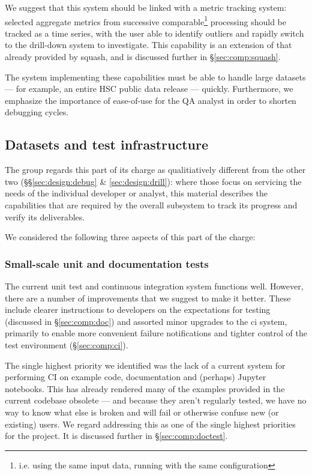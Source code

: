 We suggest that this system should be linked with a metric tracking system:
selected \glspl{aggregate metric} from successive comparable\footnote{i.e.
using the same input data, running with the same configuration} processing
should be tracked as a time series, with the user able to identify outliers
and rapidly switch to the drill-down system to investigate. This capability is
an extension of that already provided by \gls{squash}, and is discussed
further in \S\ref{sec:comp:squash}.

The system implementing these capabilities must be able to handle large
datasets --- for example, an entire HSC public data release --- quickly.
Furthermore, we emphasize the importance of ease-of-use for the QA analyst in
order to shorten debugging cycles.

\subsection{Datasets and test infrastructure}
\label{sec:design:test}

The group regards this part of its charge as qualitiatively different from the
other two (\S\S\ref{sec:design:debug} \& \ref{sec:design:drill}): where those
focus on servicing the needs of the individual developer or analyst, this
material describes the capabilities that are required by the overall subsystem
to track its progress and verify its deliverables.

We considered the following three aspects of this part of the charge:

\subsubsection{Small-scale unit and documentation tests}

The current unit test and continuous integration system functions well.
However, there are a number of improvements that we suggest to make it better.
These include clearer instructions to developers on the expectations for
testing (discussed in \S\ref{sec:comp:doc}) and assorted minor upgrades to the
\gls{ci} system, primarily to enable more convenient failure notifications and
tighter control of the test environment (\S\ref{sec:comp:ci}).

The single highest priority we identified was the lack of a current system for
performing CI on example code, documentation and (perhaps) Jupyter notebooks.
This has already rendered many of the examples provided in the current
codebase obsolete --- and because they aren't regularly tested, we have no way
to know what else is broken and will fail or otherwise confuse new (or
existing) users. We regard addressing this as one of the single highest
priorities for the project. It is discussed further in
\S\ref{sec:comp:doctest}.

